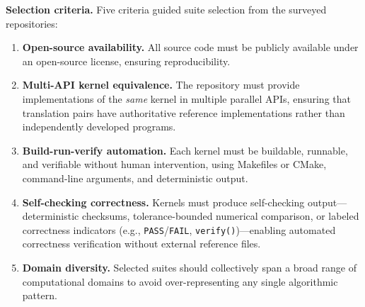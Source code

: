


\textbf{Selection criteria.} Five criteria guided suite selection from the surveyed repositories:

\begin{enumerate}
\item \textbf{Open-source availability.} All source code must be publicly available under an open-source license, ensuring reproducibility.
\item \textbf{Multi-API kernel equivalence.} The repository must provide implementations of the \emph{same} kernel in multiple parallel APIs, ensuring that translation pairs have authoritative reference implementations rather than independently developed programs.
\item \textbf{Build-run-verify automation.} Each kernel must be buildable, runnable, and verifiable without human intervention, using Makefiles or CMake, command-line arguments, and deterministic output.
\item \textbf{Self-checking correctness.} Kernels must produce self-checking output---deterministic checksums, tolerance-bounded numerical comparison, or labeled correctness indicators (e.g., \texttt{PASS}/\texttt{FAIL}, \texttt{verify()})---enabling automated correctness verification without external reference files.
\item \textbf{Domain diversity.} Selected suites should collectively span a broad range of computational domains to avoid over-representing any single algorithmic pattern.
\end{enumerate}

